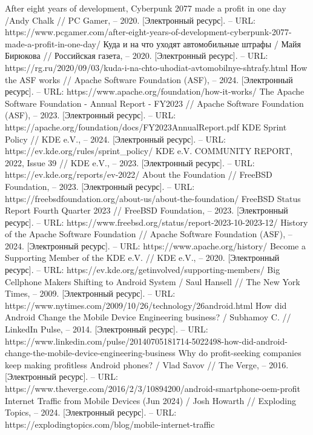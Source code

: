 \documentclass{article}
\begin{document}
\begin{thebibliography}{2}
 After eight years of development, Cyberpunk 2077 made a profit in one day /Andy Chalk // PC Gamer, – 2020. [Электронный ресурс]. – URL: https://www.pcgamer.com/after-eight-years-of-development-cyberpunk-2077-made-a-profit-in-one-day/
 Куда и на что уходят автомобильные штрафы / Майя Бирюкова // Российская газета, – 2020. [Электронный ресурс]. – URL: https://rg.ru/2020/09/03/kuda-i-na-chto-uhodiat-avtomobilnye-shtrafy.html
 How the ASF works // Apache Software Foundation (ASF), – 2024. [Электронный ресурс]. – URL: https://www.apache.org/foundation/how-it-works/
 The Apache Software Foundation - Annual Report - FY2023 // Apache Software Foundation (ASF), – 2023. [Электронный ресурс]. – URL: https://apache.org/foundation/docs/FY2023AnnualReport.pdf
 KDE Sprint Policy // KDE e.V., – 2024. [Электронный ресурс]. – URL: https://ev.kde.org/rules/sprint\_policy/
 KDE e.V. COMMUNITY REPORT, 2022, Issue 39 // KDE e.V., – 2023. [Электронный ресурс]. – URL: https://ev.kde.org/reports/ev-2022/
 About the Foundation // FreeBSD Foundation, – 2023. [Электронный ресурс]. – URL: https://freebsdfoundation.org/about-us/about-the-foundation/
 FreeBSD Status Report Fourth Quarter 2023 // FreeBSD Foundation, – 2023. [Электронный ресурс]. – URL: https://www.freebsd.org/status/report-2023-10-2023-12/
 History of the Apache Software Foundation // Apache Software Foundation (ASF), – 2024. [Электронный ресурс]. – URL: https://www.apache.org/history/
 Become a Supporting Member of the KDE e.V. // KDE e.V., – 2020. [Электронный ресурс]. – URL: https://ev.kde.org/getinvolved/supporting-members/
 Big Cellphone Makers Shifting to Android System / Saul Hansell // The New York Times, – 2009. [Электронный ресурс]. – URL: https://www.nytimes.com/2009/10/26/technology/26android.html
 How did Android Change the Mobile Device Engineering business? / Subhamoy C. // LinkedIn Pulse, – 2014. [Электронный ресурс]. – URL: https://www.linkedin.com/pulse/20140705181714-5022498-how-did-android-change-the-mobile-device-engineering-business
 Why do profit-seeking companies keep making profitless Android phones? / Vlad Savov // The Verge, – 2016. [Электронный ресурс]. – URL: https://www.theverge.com/2016/2/3/10894200/android-smartphone-oem-profit
 Internet Traffic from Mobile Devices (Jun 2024) / Josh Howarth // Exploding Topics, – 2024. [Электронный ресурс]. – URL: https://explodingtopics.com/blog/mobile-internet-traffic

\end{thebibliography}
\end{document}
